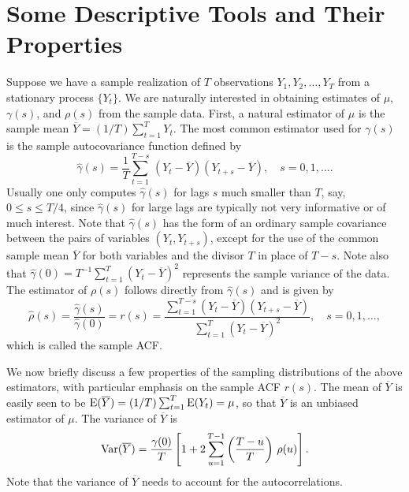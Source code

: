 \section{Some Descriptive Tools and Their Properties} 


Suppose we have a sample realization of $T$ observations $Y_1, Y_2, \ldots, Y_T$ from a stationary process $\{Y_t\}$. We are naturally interested in obtaining estimates of $\mu$, $\gamma(s)$, and $\rho(s)$ from the sample data. First, a natural estimator of $\mu$ is the sample mean $\overline{Y}= (1/T) \sum_{t=1}^T Y_t$. The most common estimator used for $\gamma(s)$ is the sample autocovariance function defined by
	\[
	\hat{\gamma}(s)= \frac{1}{T} \sum_{t=1}^{T-s} \, \left(Y_{t}-\overline{Y}\right) \left(Y_{t+s}-\overline{Y}\right), \quad s=0, 1, \ldots.
	\]
Usually one only computes $\hat{\gamma}(s)$ for lags $s$ much smaller than $T$, say, $0 \leq s \leq T/4$, since $\hat{\gamma}(s)$ for large lags are typically not very informative or of much interest. Note that $\hat{\gamma}(s)$ has the form of an ordinary sample covariance between the pairs of variables $(Y_t, Y_{t+s})$, except for the use of the common sample mean $\overline{Y}$ for both variables and the divisor $T$ in place of $T-s$.  Note also that $\hat{\gamma}(0) = T^{-1}\sum_{t=1}^T (Y_t-\overline{Y})^2$ represents the sample variance of the data.  The estimator of $\rho(s)$ follows directly from $\hat{\gamma}(s)$ and is given by
	\begin{equation} \label{eqn:hatrho}
         \hat{\rho}(s)= \frac{\hat{\gamma}(s)}{\hat{\gamma}(0)}= r(s)= \frac{\sum_{t=1}^{T-s} \left(Y_{t}-\overline{Y}\right) \left(Y_{t+s}-\overline{Y}\right)}{\sum_{t=1}^T(Y_t-\overline{Y})^2} , \quad s= 0, 1, \ldots,
	\end{equation}
which is called the sample ACF.  


We now briefly discuss a few properties of the sampling distributions of the above estimators, with particular emphasis on the sample ACF $r(s)$.  The mean of $\overline{Y}$ is easily seen to be $\operatorname{E}(\overline{Y})= (1/T) \sum_{t=1}^T \operatorname{E}(Y_t) = \mu$, so that $\overline{Y}$ is an unbiased estimator of $\mu$.  The variance of $\overline{Y}$ is
	\begin{equation} \label{eqn:var}
        \var(\overline{Y})= \frac{\gamma(0)}{T} \left[ 1 + 2 \sum_{u=1}^{T-1} \left(\dfrac{T - u}{T}\right)\, \rho(u) \right].
        \end{equation}
Note that the variance of $\overline{Y}$ needs to account for the autocorrelations. 


